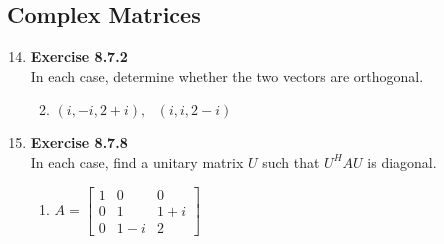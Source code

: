 \documentclass[12pt, a4paper]{scrartcl}
\begin{document}
    \subsection*{Complex Matrices}
        \begin{enumerate}
            \setcounter{enumi}{13}
            \item \textbf{Exercise 8.7.2}\\In each case, determine whether the two vectors are orthogonal.
            \begin{enumerate}
                \setcounter{enumii}{1}
                \item $(i, -i, 2+i),\mbox{ }(i, i, 2-i)$
                
            \end{enumerate}
            
            \item \textbf{Exercise 8.7.8}\\In each case, find a unitary matrix $U$ such that $U^HAU$ is diagonal.
            \setcounter{enumii}{5}
            \begin{enumerate}
                \item $A=\begin{bmatrix}
                    1&0&0\\
                    0&1&1+i\\
                    0&1-i&2
                \end{bmatrix}$

            \end{enumerate}
        \end{enumerate}
\end{document}
